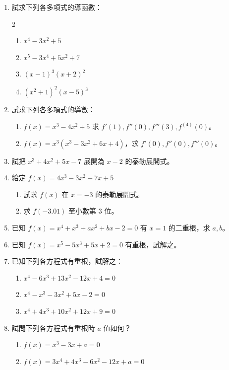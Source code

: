 \begin{enumerate}[label=\arabic*., leftmargin=2em]
  \item 試求下列各多項式的導函數：
  \begin{multicols}{2}
  \begin{enumerate}[label=(\roman*)]
    \item $x^4-3x^2+5$
    \item $x^5-3x^4+5x^2+7$
    \item $(x-1)^3(x+2)^2$
    \item $(x^2+1)^2(x-5)^3$
  \end{enumerate}
  \end{multicols}

  \item 試求下列各多項式的導數：
  \begin{enumerate}[label=(\roman*)]
    \item $f(x)=x^3-4x^2+5$ 求 $f'(1), f''(0), f'''(3), f^{(4)}(0)$。
    \item $f(x)=x^3(x^3-3x^2+6x+4)$，求 $f'(0), f''(0), f'''(0)$。
  \end{enumerate}

  \item 試把 $x^3+4x^2+5x-7$ 展開為 $x-2$ 的泰勒展開式。

  \item 給定 $f(x)=4x^3-3x^2-7x+5$
  \begin{enumerate}[label=(\roman*)]
    \item 試求 $f(x)$ 在 $x=-3$ 的泰勒展開式。
    \item 求 $f(-3.01)$ 至小數第 3 位。
  \end{enumerate}

  \item 已知 $f(x)=x^4+x^3+ax^2+bx-2=0$ 有 $x=1$ 的二重根，求 $a, b$。

  \item 已知 $f(x)=x^5-5x^3+5x+2=0$ 有重根，試解之。

  \item 已知下列各方程式有重根，試解之：
  \begin{enumerate}[label=(\roman*)]
    \item $x^4-6x^3+13x^2-12x+4=0$
    \item $x^4-x^3-3x^2+5x-2=0$
    \item $x^4+4x^3+10x^2+12x+9=0$
  \end{enumerate}

  \item 試問下列各方程式有重根時 $a$ 值如何？
  \begin{enumerate}[label=(\roman*)]
    \item $f(x)=x^3-3x+a=0$
    \item $f(x)=3x^4+4x^3-6x^2-12x+a=0$
  \end{enumerate}


\end{enumerate}
